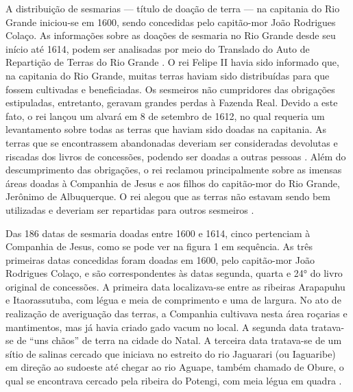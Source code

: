 \begin{refsection}
A distribuição de sesmarias --- título de doação de terra --- na capitania do Rio Grande iniciou-se em 1600, sendo concedidas pelo capitão-mor João Rodrigues Colaço. As informações sobre as doações de sesmaria no Rio Grande desde seu início até 1614, podem ser analisadas por meio do Translado do Auto de Repartição de Terras do Rio Grande \cite{Translado1909}. O rei Felipe II havia sido informado que, na capitania do Rio Grande, muitas terras haviam sido distribuídas para que fossem cultivadas e beneficiadas. Os sesmeiros não cumpridores das obrigações estipuladas, entretanto, geravam grandes perdas à Fazenda Real. Devido a este fato, o rei lançou um alvará em 8 de setembro de 1612, no qual requeria um levantamento sobre todas as terras que haviam sido doadas na capitania. As terras que se encontrassem abandonadas deveriam ser consideradas devolutas e riscadas dos livros de concessões, podendo ser doadas a outras pessoas \cite[p.~7--12]{Translado1909}. Além do descumprimento das obrigações, o rei reclamou principalmente sobre as imensas áreas doadas à Companhia de Jesus e aos filhos do capitão-mor do Rio Grande, Jerônimo de Albuquerque. O rei alegou que as terras não estavam sendo bem utilizadas e deveriam ser repartidas para outros sesmeiros \cite[p.~6--9]{Translado1909}.  

Das 186 datas de sesmaria doadas entre 1600 e 1614, cinco pertenciam à Companhia de Jesus, como se pode ver na figura 1 em sequência. As três primeiras datas concedidas foram doadas em 1600, pelo capitão-mor João Rodrigues Colaço, e são correspondentes às datas segunda, quarta e 24° do livro original de concessões. A primeira data localizava-se entre as ribeiras Arapapuhu e Itaorassutuba, com légua e meia de comprimento e uma de largura. No ato de realização de averiguação das terras, a Companhia cultivava nesta área roçarias e mantimentos, mas já havia criado gado vacum no local. A segunda data tratava-se de “uns chãos” de terra na cidade do Natal. A terceira data tratava-se de um sítio de salinas cercado que iniciava no estreito do rio Jaguarari (ou Iaguaribe) em direção ao sudoeste até chegar ao rio Aguape, também chamado de Obure, o qual se encontrava cercado pela ribeira do Potengi, com meia légua em quadra \cite[p.~19,~20~e~25]{Translado1909}.



\end{refsection}
